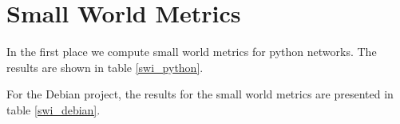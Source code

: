 \section{Small World Metrics}

In the first place we compute small world metrics for python networks. The results are shown in table \ref{swi_python}.



For the Debian project, the results for the small world metrics are presented in table \ref{swi_debian}.


